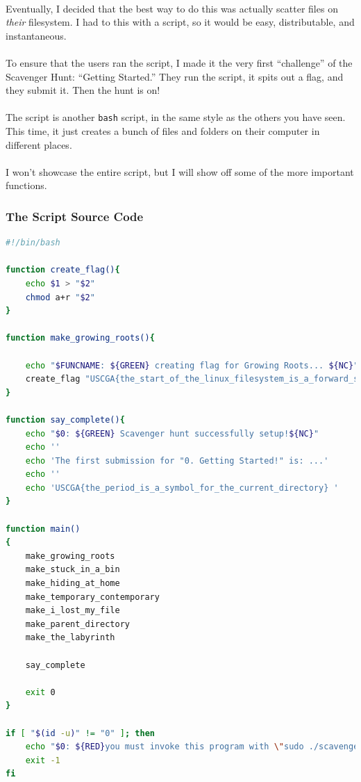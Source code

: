 \documentclass[11pt]{article}
\begin{document}
	\paragraph{} Eventually, I decided that the best way to do this was actually scatter files on \textit{their} filesystem. I had to this with a script, so it would be easy, distributable, and instantaneous.

	\paragraph{} To ensure that the users ran the script, I made it the very first ``challenge'' of the Scavenger Hunt: ``Getting Started.'' They run the script, it spits out a flag, and they submit it. Then the hunt is on!

	\paragraph{} The script is another \texttt{bash} script, in the same style as the others you have seen. This time, it just creates a bunch of files and folders on their computer in different places.

	\paragraph{} I won't showcase the entire script, but I will show off some of the more important functions.

	\newpage


	\subsubsection{The Script Source Code}

	\begin{lstlisting}[language=bash]
#!/bin/bash

function create_flag(){
	echo $1 > "$2"
	chmod a+r "$2"
}

function make_growing_roots(){

	echo "$FUNCNAME: ${GREEN} creating flag for Growing Roots... ${NC}"
	create_flag "USCGA{the_start_of_the_linux_filesystem_is_a_forward_slash}" "/FINDME1.txt"
}

function say_complete(){
	echo "$0: ${GREEN} Scavenger hunt successfully setup!${NC}"
	echo ''
	echo 'The first submission for "0. Getting Started!" is: ...'
	echo ''
	echo 'USCGA{the_period_is_a_symbol_for_the_current_directory} ' 
}

function main()
{
	make_growing_roots
	make_stuck_in_a_bin
	make_hiding_at_home
	make_temporary_contemporary
	make_i_lost_my_file
	make_parent_directory
	make_the_labyrinth

	say_complete

	exit 0
}

if [ "$(id -u)" != "0" ]; then
	echo "$0: ${RED}you must invoke this program with \"sudo ./scavenger_hunt\".${NC}"
	exit -1
fi
\end{lstlisting}	
\end{document}
